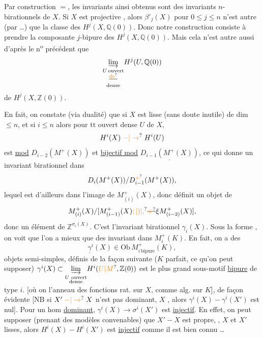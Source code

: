 Par construction $=$, les invariants ainsi obtenus sont des invariants $n$-birationnels de $X$. Si $X$ est projective , alors $\beta'_j(X)$ pour $0\leq j\leq n$ n'est autre (par  \dots) que la classe des $H^j(X,\mathbb Q(0))$. Donc notre construction consiste à prendre la composante $j$-bipure des $H^j(X,\mathbb Q(0))$. Mais cela n'est autre aussi
d'après le n\textsuperscript{o} précédent que  
\[
\underset{\substack{U\,\text{ouvert}\\\deleted{\text{\unsure{de}}}\\\text{dense}}}{\underrightarrow{\lim}}H^j(U,\mathbb Q(0))
\]
de $H^j(X,\mathbb Z(0))$.

En fait, on constate (via dualité) que si $X$ est lisse (sans doute inutile) de dim $\leq n$, et si $i\leq n$ alors pour tt ouvert dense $U$ de $X$,
\[
H^i(X)\mathrel{\unsure{-|\to}}H^i(U)
\]
est \uline{ mod} $D_{i-2}(M^+(X))$ et \uline{bijectif mod} $\underline{D_{i-1}(M^+(X))}$, ce qui donne un invariant birationnel dans
\[
D_{i}(M^+(X))/D^{\unsure{+}}_{i-1}(M^+(X)),
\]
lequel est d'ailleurs dans l'image de $M^+_{(i)}(X)$, donc définit un objet de
\[
M^+_{(i)}(X)/[M^+_{(i-1)}(X)\unsure{;|)|,}\deleted{\unsure{+}}\xi M^+_{(i-2)}(X)],
\]
donc un élément de $\mathbb Z^{\sigma_i(X)}$. C'est l'invariant birationnel $\gamma_i(X)$.
Sous la forme , on voit que l'on a mieux que des invariant dans $M^+_i(K)$. En fait, on a des
\[
\underline{\gamma}^{i}(X)\in\mathrm{Ob}\, M^+_{i\,\mathrm{bipure}}(K),
\]
objets semi-simples, définis de la façon suivante ($K$ parfait, ce qu'on peut supposer) $\gamma^i(X)\subset\underset{\substack{U\text{ ouvert}\\\text{dense}}}{\underrightarrow{\lim}}H^i(\unsure{U|M},\mathbb Z(0))$ est le plus grand sous-motif \uline{bipure} de type $i$. \deleted{[\unsure{Alors|la} le quotient par $\gamma^i(X)$}  [où on l'anneau des fonctions rat. sur $X$, comme alg. sur $K$], de façon évidente
[NB si $X'\mathrel{\unsure{-|\to}}X$ n'est pas dominant, $X$ , alors $\gamma^i(X)\mathrel{-}\gamma^i(X')$ est nul]. Pour un hom \uline{dominant}, $\gamma^i(X)\longrightarrow\sigma^{i}(X')$ est \uline{injectif}. En effet, on peut supposer (prenant des modèles convenables) que $X'\mathrel{-}X$ est propre, , $X$ et $X'$ lisses, alors $H^i(X)\mathrel{-}H^i(X')$ est \uline{injectif} comme il est bien connu \dots


